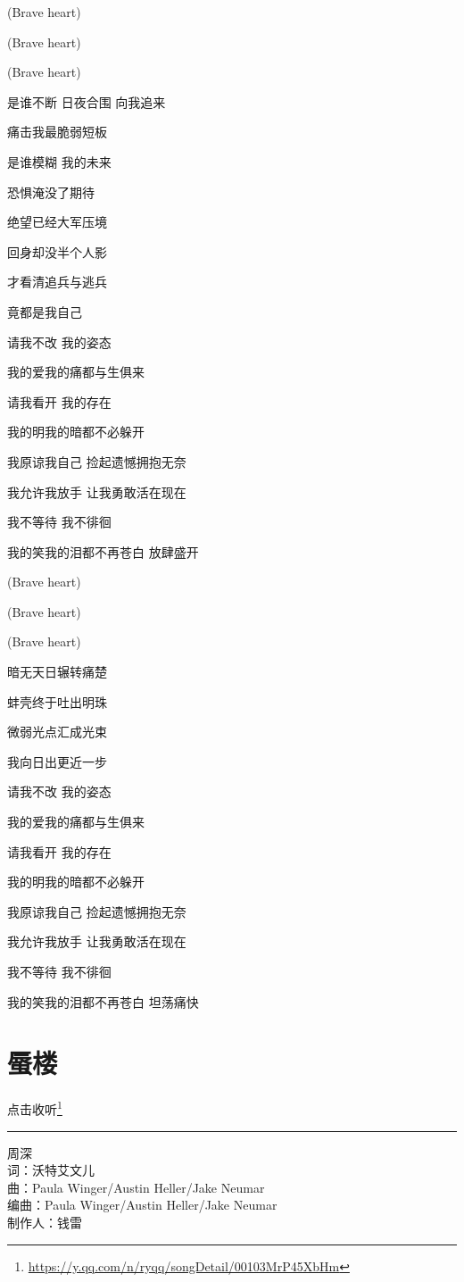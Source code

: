 \documentclass[]{ctexbook}
\renewcommand{\href}[2]{#2\footnote{\url{#1}}}
\begin{document}
(Brave heart)

(Brave heart)

(Brave heart)

是谁不断 日夜合围 向我追来

痛击我最脆弱短板

是谁模糊 我的未来

恐惧淹没了期待

绝望已经大军压境

回身却没半个人影

才看清追兵与逃兵

竟都是我自己

请我不改 我的姿态

我的爱我的痛都与生俱来

请我看开 我的存在

我的明我的暗都不必躲开

我原谅我自己 捡起遗憾拥抱无奈

我允许我放手 让我勇敢活在现在

我不等待 我不徘徊

我的笑我的泪都不再苍白 放肆盛开

(Brave heart)

(Brave heart)

(Brave heart)

暗无天日辗转痛楚

蚌壳终于吐出明珠

微弱光点汇成光束

我向日出更近一步

请我不改 我的姿态

我的爱我的痛都与生俱来

请我看开 我的存在

我的明我的暗都不必躲开

我原谅我自己 捡起遗憾拥抱无奈

我允许我放手 让我勇敢活在现在

我不等待 我不徘徊

我的笑我的泪都不再苍白 坦荡痛快

\section*{蜃楼}\label{mirage}


\href{https://y.qq.com/n/ryqq/songDetail/00103MrP45XbHm}{点击收听}

\begin{center}\rule{0.5\linewidth}{0.5pt}\end{center}

周深\\
词：沃特艾文儿\\
曲：Paula Winger/Austin Heller/Jake Neumar\\
编曲：Paula Winger/Austin Heller/Jake Neumar\\
制作人：钱雷
\end{document}
